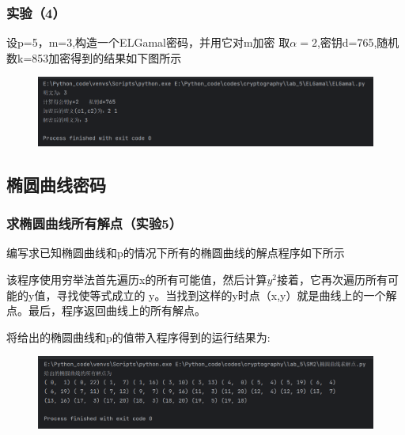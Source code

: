 \documentclass[a4paper,11pt,UTF8]{ctexart}
\newcommand{\bottomcaption}{%
\setlength{\abovecaptionskip}{6pt}%
\setlength{\belowcaptionskip}{6pt}%
\caption}
\newcommand{\xiaowuhao}{\fontsize{9pt}{\baselineskip}\selectfont}   %
\begin{document}
        \subsubsection{实验（4）}
            设p=5，m=3,构造一个ELGamal密码，并用它对m加密
            取$\alpha =2$,密钥d=765,随机数k=853加密得到的结果如下图所示
            \begin{figure}[H]
                \centering
                \includegraphics[width=13cm]{EL_result2.png}
                \bottomcaption{\xiaowuhao{测试算法2运行结果}}
            \end{figure}
\newpage
    \subsection{椭圆曲线密码}

        \subsubsection{求椭圆曲线所有解点（实验5）}
            编写求已知椭圆曲线和p的情况下所有的椭圆曲线的解点程序如下所示
            
            该程序使用穷举法首先遍历x的所有可能值，然后计算$y^{2}$接着，它再次遍历所有可能的y值，寻找使等式成立的 
            y。当找到这样的y时点（x,y）就是曲线上的一个解点。最后，程序返回曲线上的所有解点。\par
            将给出的椭圆曲线和p的值带入程序得到的运行结果为:
            \begin{figure}[H]
                \centering
                \includegraphics[width=13cm]{椭圆result1.png}
                \bottomcaption{\xiaowuhao{解点计算结果}}
            \end{figure}
        
\end{document}
